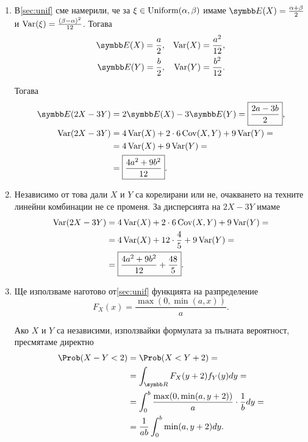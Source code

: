 \documentclass[
  headings=standardclasses,
  bibliography=totocnumbered,
]{scrartcl}
\begin{document}
\begin{solution}
  \mbox{}
  \begin{enumerate}[label=\alph*)]
    \item В\cref{sec:unif} сме намерили, че за \( \xi \in \operatorname{Uniform}(\alpha, \beta) \) имаме \( \Expect(X) = \frac {\alpha + \beta} 2 \) и \( \operatorname{Var}(\xi) = \frac {{(\beta - \alpha)}^2} {12} \). Тогава
    \begin{align*}
      \Expect(X) = \frac a 2,
      &&
      \Var(X) = \frac {a^2} {12},
      \\
      \Expect(Y) = \frac b 2,
      &&
      \Var(Y) = \frac {b^2} {12}.
    \end{align*}

    Тогава
    \begin{align*}
      \Expect(2X - 3Y)
      &=
      2\Expect(X) - 3\Expect(Y)
      =
      \boxed{\frac {2a - 3b} 2},
      \\
      \Var(2X - 3Y)
      &=
      4\Var(X) + 2 \cdot 6 \Cov(X, Y) + 9\Var(Y)
      = \\ &=
      4\Var(X) + 9\Var(Y)
      = \\ &=
      \boxed{\frac {4a^2 + 9b^2} {12}}.
    \end{align*}

    \item Независимо от това дали \( X \) и \( Y \) са корелирани или не, очакването на техните линейни комбинации не се променя. За дисперсията на \( 2X - 3Y \) имаме
    \begin{align*}
      \operatorname{Var}(2X - 3Y)
      &=
      4\operatorname{Var}(X) + 2 \cdot 6 \operatorname{Cov}(X, Y) + 9\operatorname{Var}(Y)
      = \\ &=
      4\operatorname{Var}(X) + 12 \cdot \frac 4 5 + 9\operatorname{Var}(Y)
      = \\ &=
      \boxed{\frac {4a^2 + 9b^2} {12} + \frac {48} 5}.
    \end{align*}

    \item Ще използваме наготово от\cref{sec:unif} функцията на разпределение
    \begin{equation*}
      F_X(x) = \frac {\max(0, \min(a, x))} a.
    \end{equation*}

     Ако \( X \) и \( Y \) са независими, използвайки формулата за пълната вероятност, пресмятаме директно
    \begin{align*}
      \Prob(X - Y < 2)
      &=
      \Prob(X < Y + 2)
      = \\ &=
      \int_{\R} F_X(y+2) f_Y(y) dy
      = \\ &=
      \int_0^b \frac {\max(0, \min(a, y+2))} a \cdot \frac 1 b dy
      = \\ &=
      \frac 1 {ab} \int_0^b \min(a, y+2) dy.
    \end{align*}


\end{enumerate}
\end{solution}
\end{document}
